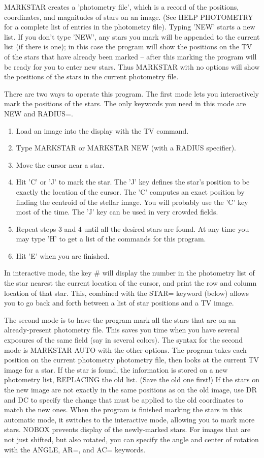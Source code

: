 MARKSTAR creates a 'photometry file', which is a record of the positions,
coordinates, and magnitudes of stars on an image.  (See HELP PHOTOMETRY for
a complete list of entries in the photometry file).  Typing 'NEW' starts a
new list.  If you don't type 'NEW', any stars you mark will be appended to
the current list (if there is one); in this case the program will show the
positions on the TV of the stars that have already been marked -- after
this marking the program will be ready for you to enter new stars.  Thus
MARKSTAR with no options will show the positions of the stars in the
current photometry file.

There are two ways to operate this program.  The first mode lets you
interactively mark the positions of the stars.  The only keywords you need
in this mode are NEW and RADIUS=.
\begin{enumerate}
  \item{Load an image into the display with the TV command.}
  \item{Type MARKSTAR or MARKSTAR NEW (with a RADIUS specifier).}
  \item{Move the cursor near a star.}
  \item{Hit 'C' or 'J' to mark the star.
    The 'J' key defines the star's position to be exactly
    the location of the cursor.  The 'C' computes
    an exact position by finding the centroid of the
    stellar image.  You will probably use the 'C' key
    most of the time.  The 'J' key can be used in very
    crowded fields.  }
  \item{Repeat steps 3 and 4 until all the desired stars are found.
    At any time you may type 'H' to get a list
    of the commands for this program.}
  \item{Hit 'E' when you are finished.}
\end{enumerate}

In interactive mode, the key \# will display the number in the photometry
list of the star nearest the current location of the cursor, and print the
row and column location of that star.  This, combined with the STAR=
keyword (below) allows you to go back and forth between a list of star
positions and a TV image.

The second mode is to have the program mark all the stars that are on an
already-present photometry file.  This saves you time when you have several
exposures of the same field (say in several colors).  The syntax for the
second mode is MARKSTAR AUTO with the other options.  The program takes
each position on the current photometry photometry file, then looks at the
current TV image for a star.  If the star is found, the information is
stored on a new photometry list, REPLACING the old list.  (Save the old one
first!) If the stars on the new image are not exactly in the same positions
as on the old image, use DR and DC to specify the change that must be
applied to the old coordinates to match the new ones.  When the program is
finished marking the stars in this automatic mode, it switches to the
interactive mode, allowing you to mark more stars.  NOBOX prevents display
of the newly-marked stars. For images that are not just shifted, but also
rotated, you can specify the angle and center of rotation with the ANGLE,
AR=, and AC= keywords.

